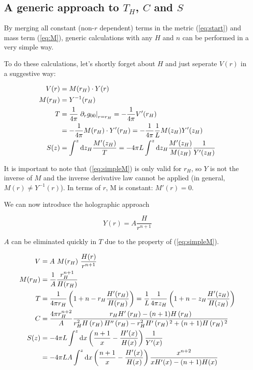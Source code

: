 \documentclass[10pt,a4paper, fleqn]{article}
\begin{document}
\subsection{A generic approach to $T_H$, $C$ and $S$}
By merging all constant (non-$r$ dependent) terms in the metric (\ref{eq:start}) and mass term (\ref{eq:M}), generic calculations with any $H$ and $n$ can be performed in a very simple way.

To do these calculations, let's shortly forget about $H$ and just seperate $V(r)$ in a suggestive way:

\begin{align}
V(r) &= M(r_H) \cdot Y(r) \label{eq:simpleV} \\
M(r_H) &= Y^{-1}(r_H)%
\label{eq:simpleM} \\
T &= \frac{1}{4\pi} \left. \partial_r g_{00} \right|_{r=r_H} = - \frac{1}{4\pi} V'(r_H)  \\
&= - \frac{1}{4\pi} M(r_H) \cdot Y'(r_H) = - \frac{1}{4\pi}\frac 1L M(z_H) Y'(z_H)  \\
S(z) &= \int^z \d z_H \frac {M'(z_H)}T 
 =  -4\pi L \int^z \d z_H\frac{M'(z_H)}{M(z_H)} \frac  1{Y'(z_H)} 
\end{align}

It is important to note that (\ref{eq:simpleM}) is only valid for $r_H$, so $Y$ is not the inverse of $M$ and the inverse derivative law cannot be applied (in general, $M(r) \neq Y^{-1}(r)$). In terms of $r$, M is constant: $M'(r) = 0$.

We can now introduce the holographic approach

\begin{equation}
Y(r)=A \frac{H}{r^{n+1}}
\end{equation}

$A$ can be eliminated quickly in $T$ due to the property of (\ref{eq:simpleM}).

\begin{align}
V &= A~M(r_H)~\frac{H(r)}{r^{n+1}} \\
M(r_H) &= \frac{1}{A} \frac{r_H^{n+1}}{H(r_H)} \\
T &= \frac{1}{4\pi r_H} \left( 1 + n - r_H \frac{H'(r_H)}{H(r_H)} \right)
 = \frac 1L \frac{1}{4\pi z_H} \left( 1 + n - z_H \frac{H'(z_H)}{H(z_H)} \right)
 \label{eq:simpleT} \\
\label{eq:simpleC} C &=  %
\frac{4\pi r_H^{n+2}}{A}
\frac{r_H H'\left(r_H\right)-(n+1) H\left(r_H\right)}
   {r_H^2 H\left(r_H\right)
   H''\left(r_H\right)-r_H^2 H'\left(r_H\right){}^2+(n+1) H\left(r_H\right){}^2} \\
S(z) &= -4\pi L \int^z \d x \left( \frac {n+1}x - \frac {H'(x)}{H(x)} \right) \frac 1{Y'(x)} \\
&= -4 \pi LA \int^z \d x \left( \frac {n+1}x - \frac {H'(x)}{H(x)} \right)
\frac{x^{n+2}}{x H'(x) - (n+1) H(x)}  \label{eq:Sgeneric} 
\end{align}
\end{document}
